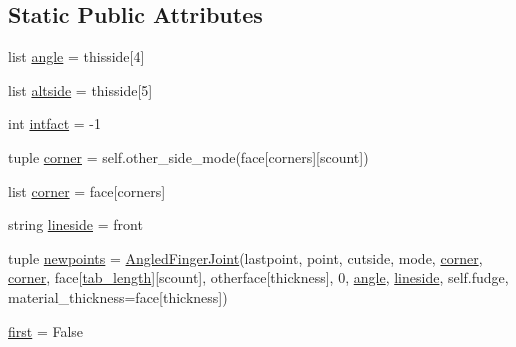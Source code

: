 \subsection*{Static Public Attributes}
\begin{DoxyCompactItemize}
\item 
list \hyperlink{classboxes_1_1_arbitrary_box_a24dede6e660c9936ee28185e18db8429}{angle} = thisside\mbox{[}4\mbox{]}
\item 
list \hyperlink{classboxes_1_1_arbitrary_box_acbfdd7c527a5b086353fe2f11b372878}{altside} = thisside\mbox{[}5\mbox{]}
\item 
int \hyperlink{classboxes_1_1_arbitrary_box_ae912ddb018d7bd63da77694182248957}{intfact} = -\/1
\item 
tuple \hyperlink{classboxes_1_1_arbitrary_box_a90869c57f87100a6f9264f2f51af9a39}{corner} = self.\+other\+\_\+side\+\_\+mode(face\mbox{[}\textquotesingle{}corners\textquotesingle{}\mbox{]}\mbox{[}scount\mbox{]})
\item 
list \hyperlink{classboxes_1_1_arbitrary_box_a8dc28779357a95d463917e378be209fa}{corner} = face\mbox{[}\textquotesingle{}corners\textquotesingle{}\mbox{]}
\item 
string \hyperlink{classboxes_1_1_arbitrary_box_a1df58541f5d802020fb5f27a57861ca6}{lineside} = \textquotesingle{}front\textquotesingle{}
\item 
tuple \hyperlink{classboxes_1_1_arbitrary_box_abedf2ff5c000b46d146b0b11e5872bf7}{newpoints} = \hyperlink{classshapes_1_1_angled_finger_joint}{Angled\+Finger\+Joint}(lastpoint, point, cutside, mode, \hyperlink{classboxes_1_1_arbitrary_box_a90869c57f87100a6f9264f2f51af9a39}{corner}, \hyperlink{classboxes_1_1_arbitrary_box_a90869c57f87100a6f9264f2f51af9a39}{corner}, face\mbox{[}\textquotesingle{}\hyperlink{classboxes_1_1_arbitrary_box_aa3f4f131456dc23999d99a422041c842}{tab\+\_\+length}\textquotesingle{}\mbox{]}\mbox{[}scount\mbox{]}, otherface\mbox{[}\textquotesingle{}thickness\textquotesingle{}\mbox{]}, 0, \hyperlink{classboxes_1_1_arbitrary_box_a24dede6e660c9936ee28185e18db8429}{angle}, \hyperlink{classboxes_1_1_arbitrary_box_a1df58541f5d802020fb5f27a57861ca6}{lineside}, self.\+fudge, material\+\_\+thickness=face\mbox{[}\textquotesingle{}thickness\textquotesingle{}\mbox{]})
\item 
\hyperlink{classboxes_1_1_arbitrary_box_ace4c98fbe4b9323796fd991e793bdcd2}{first} = False
\end{DoxyCompactItemize}


